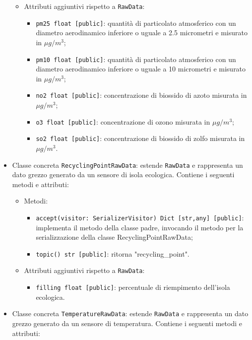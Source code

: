 \begin{itemize}
\begin{itemize}
\begin{itemize}
        \end{itemize}
        \item Attributi aggiuntivi rispetto a \texttt{RawData}:
        \begin{itemize}
            \item \texttt{pm25 float [public]}: quantità di particolato atmosferico con un diametro aerodinamico inferiore o uguale a 2.5 micrometri e misurato in $\mu g/m^3$;
            \item \texttt{pm10 float [public]}: quantità di particolato atmosferico con un diametro aerodinamico inferiore o uguale a 10 micrometri e misurato in $\mu g/m^3$;
            \item \texttt{no2 float [public]}: concentrazione di biossido di azoto misurata in $\mu g/m^3$;
            \item \texttt{o3 float [public]}: concentrazione di ozono misurata in $\mu g/m^3$;
            \item \texttt{so2 float [public]}: concentrazione di biossido di zolfo misurata in $\mu g/m^3$.
        \end{itemize}
    \end{itemize}
    \item Classe concreta \texttt{RecyclingPointRawData}: estende \texttt{RawData} e rappresenta un dato grezzo generato da un sensore di isola ecologica. Contiene i seguenti metodi e attributi:
    \begin{itemize}
        \item Metodi:
        \begin{itemize}
            \item \texttt{accept(visitor: SerializerVisitor) Dict [str,any] [public]}: implementa il metodo della classe padre, invocando il metodo per la serializzazione della classe RecyclingPointRawData;
            \item \texttt{topic() str [public]}: ritorna "recycling\_point".
        \end{itemize}
        \item Attributi aggiuntivi rispetto a \texttt{RawData}:
        \begin{itemize}
            \item \texttt{filling float [public]}: percentuale di riempimento dell'isola ecologica.
        \end{itemize}
    \end{itemize}
    \item Classe concreta \texttt{TemperatureRawData}: estende \texttt{RawData} e rappresenta un dato grezzo generato da un sensore di temperatura. Contiene i seguenti metodi e attributi:

\end{itemize}
